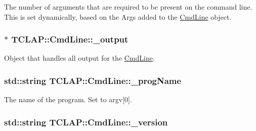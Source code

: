 The number of arguments that are required to be present on the command line. This is set dynamically, based on the Args added to the \hyperlink{class_t_c_l_a_p_1_1_cmd_line}{Cmd\+Line} object. \hypertarget{class_t_c_l_a_p_1_1_cmd_line_a5152bf4ef26217583a3bc708aa0ea83e}{
\subsubsection[{\+\_\+output}]{$\ast$ T\+C\+L\+A\+P\+::\+Cmd\+Line\+::\+\_\+output\hspace{0.3cm}{\ttfamily [protected]}}}\label{class_t_c_l_a_p_1_1_cmd_line_a5152bf4ef26217583a3bc708aa0ea83e}
Object that handles all output for the \hyperlink{class_t_c_l_a_p_1_1_cmd_line}{Cmd\+Line}. \hypertarget{class_t_c_l_a_p_1_1_cmd_line_a8b856dadc54fa30d0dddba4588ef9344}{
\subsubsection[{\+\_\+prog\+Name}]{\setlength{\rightskip}{0pt plus 5cm}std\+::string T\+C\+L\+A\+P\+::\+Cmd\+Line\+::\+\_\+prog\+Name\hspace{0.3cm}{\ttfamily [protected]}}}\label{class_t_c_l_a_p_1_1_cmd_line_a8b856dadc54fa30d0dddba4588ef9344}
The name of the program. Set to argv\mbox{[}0\mbox{]}. \hypertarget{class_t_c_l_a_p_1_1_cmd_line_a2b2b52fffed2dcb7df3cdfc582ec8fd1}{
\subsubsection[{\+\_\+version}]{\setlength{\rightskip}{0pt plus 5cm}std\+::string T\+C\+L\+A\+P\+::\+Cmd\+Line\+::\+\_\+version\hspace{0.3cm}{\ttfamily [protected]}}}\label{class_t_c_l_a_p_1_1_cmd_line_a2b2b52fffed2dcb7df3cdfc582ec8fd1}
